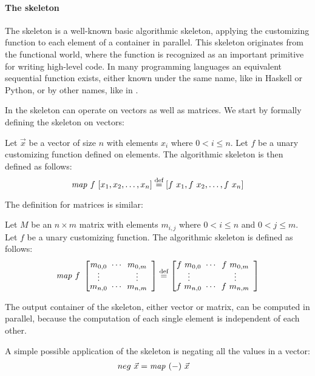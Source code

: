 \paragraph{The \map skeleton}
The \map skeleton is a well-known basic algorithmic skeleton, applying the customizing function to each element of a container in parallel.
This skeleton originates from the functional world, where the  function is recognized as an important primitive for writing high-level code.
In many programming languages an equivalent sequential function exists, either known under the same name, like in Haskell or Python, or by other names, like  in \Cpp.

In \SkelCL the \map skeleton can operate on vectors as well as matrices.
We start by formally defining the skeleton on vectors:
\begin{definition}
  \label{definition:map}
  Let $\vec{x}$ be a vector of size $n$ with elements $x_i$ where $0 < i \leq n$.
  Let $f$ be a unary customizing function defined on elements.
  The algorithmic skeleton \map is then defined as follows:
  \begin{equation*}
    \map\ f\ [x_1, x_2, \dots, x_n] \eqdef [f\ x_1, f\ x_2, \dots, f\ x_n]
  \end{equation*}
\end{definition}
\noindent
The definition for matrices is similar:
\begin{definition}
  \label{definition:map:matrix}
  Let $M$ be an $n\times m$ matrix with elements $m_{i,j}$ where $0 < i \leq n$ and $0 < j \leq m$.
  Let $f$ be a unary customizing function.
  The algorithmic skeleton \map is defined as follows:
  \begin{equation*}
    \map\ f\ \DottedMatrix{m_{0,0}}{m_{0,m}}{m_{n,0}}{m_{n,m}}
      \eqdef \DottedMatrix{f\ m_{0,0}}{f\ m_{0,m}}{f\ m_{n,0}}{f\ m_{n,m}}
  \end{equation*}
\end{definition}
\noindent
The output container of the \map skeleton, either vector or matrix, can be computed in parallel, because the computation of each single element is independent of each other.

A simple possible application of the \map skeleton is negating all the values in a vector:
\begin{align*}
  neg\ \vec{x} &= \text{\textit{map}}\ (-)\ \vec{x}
\end{align*}


